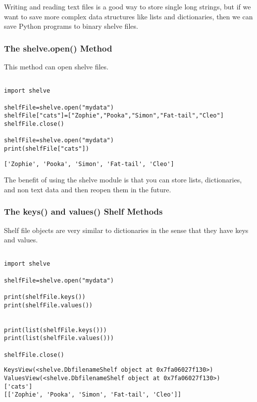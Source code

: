 \documentclass[11pt]{article}
\begin{document}
Writing and reading text files is a good way to store single long strings, but if we want to save more complex data structures like lists and dictionaries, then we can save Python programs to binary shelve files.

\subsubsection{The shelve.open() Method}
\label{sec:org3518d60}

This method can open shelve files.

\begin{verbatim}

import shelve

shelfFile=shelve.open("mydata")
shelfFile["cats"]=["Zophie","Pooka","Simon","Fat-tail","Cleo"]
shelfFile.close()

shelfFile=shelve.open("mydata")
print(shelfFile["cats"])

\end{verbatim}

\begin{verbatim}
['Zophie', 'Pooka', 'Simon', 'Fat-tail', 'Cleo']
\end{verbatim}


The benefit of using the shelve module is that you can store lists, dictionaries, and non text data and then reopen them in the future.

\subsubsection{The keys() and values() Shelf Methods}
\label{sec:org0095e3f}

Shelf file objects are very similar to dictionaries in the sense that they have keys and values.

\begin{verbatim}

import shelve

shelfFile=shelve.open("mydata")

print(shelfFile.keys())
print(shelfFile.values())


print(list(shelfFile.keys()))
print(list(shelfFile.values()))

shelfFile.close()
\end{verbatim}

\begin{verbatim}
KeysView(<shelve.DbfilenameShelf object at 0x7fa06027f130>)
ValuesView(<shelve.DbfilenameShelf object at 0x7fa06027f130>)
['cats']
[['Zophie', 'Pooka', 'Simon', 'Fat-tail', 'Cleo']]
\end{verbatim}
\end{document}
